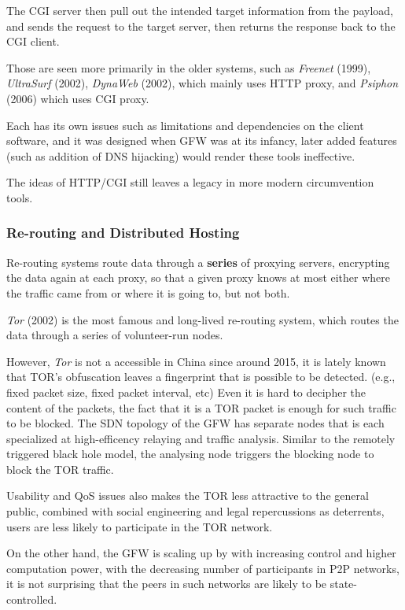 The CGI server then pull out the intended target information from the
payload, and sends the request to the target server, then returns the
response back to the CGI client.

Those are seen more primarily in the older systems, such as
\emph{Freenet} (1999), \emph{UltraSurf} (2002), \emph{DynaWeb} (2002),
which mainly uses HTTP proxy, and \emph{Psiphon} (2006) which uses CGI
proxy.

Each has its own issues such as limitations and dependencies on the
client software, and it was designed when GFW was at its infancy, later
added features (such as addition of DNS hijacking) would render these
tools ineffective.

The ideas of HTTP/CGI still leaves a legacy in more modern circumvention
tools.

\hypertarget{re-routing-and-distributed-hosting}{%
\subsubsection{Re-routing and Distributed
Hosting}\label{re-routing-and-distributed-hosting}}

Re-routing systems route data through a \textbf{series} of proxying
servers, encrypting the data again at each proxy, so that a given proxy
knows at most either where the traffic came from or where it is going
to, but not both.

\emph{Tor} (2002) is the most famous and long-lived re-routing system,
which routes the data through a series of volunteer-run nodes.

However, \emph{Tor} is not a accessible in China since around 2015, it
is lately known that TOR's obfuscation leaves a fingerprint that is
possible to be detected. (e.g., fixed packet size, fixed packet
interval, etc) Even it is hard to decipher the content of the packets,
the fact that it is a TOR packet is enough for such traffic to be
blocked. \cite{50_tor_finger} The SDN topology of the GFW has separate
nodes that is each specialized at high-efficency relaying and traffic
analysis. Similar to the remotely triggered black hole model, the
analysing node triggers the blocking node to block the TOR traffic.

Usability and QoS issues also makes the TOR less attractive to the
general public, combined with social engineering and legal repercussions
as deterrents, users are less likely to participate in the TOR network.

On the other hand, the GFW is scaling up by with increasing control and
higher computation power, with the decreasing number of participants in
P2P networks, it is not surprising that the peers in such networks are
likely to be state-controlled.

